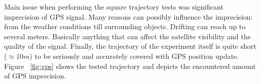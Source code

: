 Main issue when performing the square trajectory tests was significant imprecision of GPS signal. Many reasons can possibly influence the imprecision: from the weather conditions till surrounding objects. Drifting can reach up to several meters. Basically anything that can affect the satellite visibility and the quality of the signal. Finally, the trajectory of the experiment itself is quite short ($ \approx 10 m $) to be seriously and accurately covered with GPS position update. Figure ~\ref{fig:gps} shows the tested trajectory and depicts the encountered amount of GPS imprecision.
\begin{figure}%
  \centering
\end{figure}
